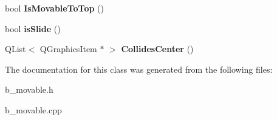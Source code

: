 \begin{DoxyCompactItemize}
\item 
\hypertarget{class_b___movable_a68bb6a98d031f9495cdeb80b9aa325c4}{}bool {\bfseries Is\+Movable\+To\+Top} ()\label{class_b___movable_a68bb6a98d031f9495cdeb80b9aa325c4}

\item 
\hypertarget{class_b___movable_a44d1413ec8bceda3b1a50c673b429d03}{}bool {\bfseries is\+Slide} ()\label{class_b___movable_a44d1413ec8bceda3b1a50c673b429d03}

\item 
\hypertarget{class_b___movable_a081e4e71fb9483330f3315e6b32bbcbb}{}Q\+List$<$ Q\+Graphics\+Item $\ast$ $>$ {\bfseries Collides\+Center} ()\label{class_b___movable_a081e4e71fb9483330f3315e6b32bbcbb}

\end{DoxyCompactItemize}


The documentation for this class was generated from the following files\+:\begin{DoxyCompactItemize}
\item 
b\+\_\+movable.\+h\item 
b\+\_\+movable.\+cpp\end{DoxyCompactItemize}
